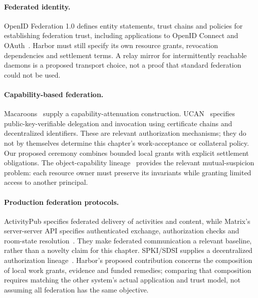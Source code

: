 \documentclass[11pt,a4paper]{article}
\theoremstyle{definition}
\theoremstyle{remark}
\begin{document}
\paragraph{Federated identity.} OpenID Federation 1.0 defines entity
statements, trust chains and policies for establishing federation trust,
including applications to OpenID Connect and OAuth~.
Harbor must still specify its own
resource grants, revocation dependencies and settlement terms. A relay mirror
for intermittently reachable daemons is a proposed transport choice, not a
proof that standard federation could not be used.

\paragraph{Capability-based federation.}
Macaroons~ supply a capability-attenuation
construction. UCAN~ specifies public-key-verifiable delegation
and invocation using certificate chains and decentralized identifiers. These
are relevant authorization mechanisms; they do not by themselves determine
this chapter's work-acceptance or collateral policy. Our proposed ceremony
combines bounded local grants with explicit settlement obligations. The
object-capability lineage~
provides the relevant mutual-suspicion problem: each resource owner must
preserve its invariants while granting limited access to another principal.

\paragraph{Production federation protocols.}
ActivityPub specifies federated delivery of activities and content, while
Matrix's server-server API specifies authenticated exchange, authorization
checks and room-state resolution~. They make
federated communication a relevant baseline, rather than a novelty claim for
this chapter. SPKI/SDSI supplies a decentralized authorization
lineage~. Harbor's proposed contribution concerns the
composition of local work grants, evidence and funded remedies; comparing
that composition requires matching the other system's actual application and
trust model, not assuming all federation has the same objective.

\ifdefined\pdbookfontprofile
\fi
\end{document}
